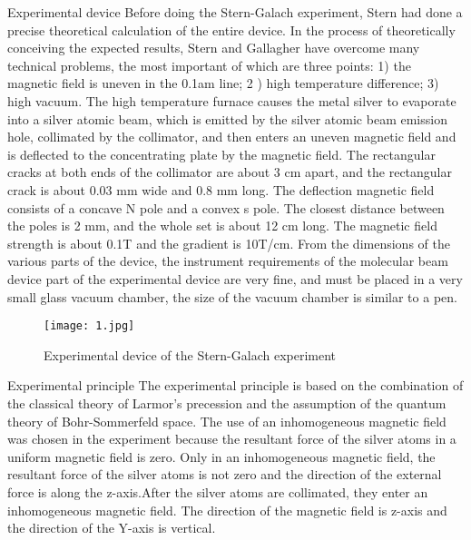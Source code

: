 \documentclass[a4paper]{article}
\begin{document}
    Experimental device
    Before doing the Stern-Galach experiment, Stern had done a precise theoretical calculation of the entire device. In the process of theoretically conceiving the expected results, Stern and Gallagher have overcome many technical problems, the most important of which are three points: 1) the magnetic field is uneven in the 0.1am line; 2 ) high temperature difference; 3) high vacuum.
\cite{Weinert1995Wrong}    
    The high temperature furnace causes the metal silver to evaporate into a silver atomic beam, which is emitted by the silver atomic beam emission hole, collimated by the collimator, and then enters an uneven magnetic field and is deflected to the concentrating plate by the magnetic field. The rectangular cracks at both ends of the collimator are about 3 cm apart, and the rectangular crack is about 0.03 mm wide and 0.8 mm long. The deflection magnetic field consists of a concave N pole and a convex s pole. The closest distance between the poles is 2 mm, and the whole set is about 12 cm long. The magnetic field strength is about 0.1T and the gradient is 10T/cm. From the dimensions of the various parts of the device, the instrument requirements of the molecular beam device part of the experimental device are very fine, and must be placed in a very small glass vacuum chamber, the size of the vacuum chamber is similar to a pen.
\cite{Ramsey1988Molecular}


\begin{figure}[htbp!] \label{1}
\centering %
    \texttt{[image: 1.jpg]}
    \caption{Experimental device of the Stern-Galach experiment}
\end{figure}





    Experimental principle
    The experimental principle is based on the combination of the classical theory of Larmor's precession and the assumption of the quantum theory of Bohr-Sommerfeld space. The use of an inhomogeneous magnetic field was chosen in the experiment because the resultant force of the silver atoms in a uniform magnetic field is zero. Only in an inhomogeneous magnetic field, the resultant force of the silver atoms is not zero and the direction of the external force is along the z-axis.After the silver atoms are collimated, they enter an inhomogeneous magnetic field. The direction of the magnetic field is z-axis and the direction of the Y-axis is vertical.
\cite{Sakurai1986Modern}
\end{document}
